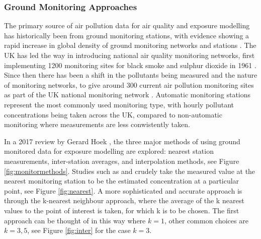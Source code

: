\subsubsection{Ground Monitoring Approaches}
The primary source of air pollution data for air quality and exposure modelling has historically been from ground monitoring stations, with evidence showing a rapid increase in global density of ground monitoring networks and stations \citep{Carvalho2016TheMonitoring}. The UK has led the way in introducing national air quality monitoring networks, first implementing 1200 monitoring sites for black smoke and sulphur dioxide in 1961 \citep{DepartmentforEnvironmentBriefHistory}. Since then there has been a shift in the pollutants being measured and the nature of monitoring networks, to give around 300 current air pollution monitoring sites as part of the UK national monitoring network \citep{DepartmentforEnvironmentMonitoringUK}. Automatic monitoring stations represent the most commonly used monitoring type, with hourly pollutant concentrations being taken across the UK, compared to non-automatic monitoring where measurements are less conwistently taken.

In a 2017 review by Gerard Hoek \citep{Hoek2017MethodsPollutants}, the three major methods of using ground monitored data for exposure modelling are explored: nearest station measurements, inter-station averages, and interpolation methods, see Figure \ref{fig:monitormethods}. Studies such as \cite{Ostro2010Long-termStudy} and \cite{Dockery1993AnCities} crudely take the measured value at the nearest monitoring station to be the estimated concentration at a particular point, see Figure \ref{fig:nearest}. A more sophisticated and accurate approach is through the k-nearest neighbour approach, where the average of the k nearest values to the point of interest is taken, for which k is to be chosen. The first approach can be thought of in this way where $k = 1$, other common choices are $k = 3,5$, see Figure \ref{fig:inter} for the case $k = 3$.

